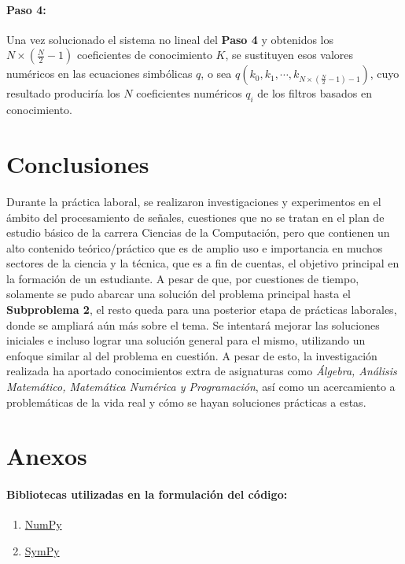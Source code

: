 \documentclass[11pt]{article}
\begin{document}
\paragraph*{Paso 4:}
Una vez solucionado el sistema no lineal del {\bf Paso 4} y obtenidos los \(N \times (\frac{N}{2} - 1)\) coeficientes de conocimiento \(K\), se sustituyen esos valores numéricos en las ecuaciones simbólicas \(q\), o sea 
\(q(k_{0}, k_{1}, \cdots, k_{N \times (\frac{N}{2} - 1) -1})\), cuyo resultado produciría los \(N\) coeficientes numéricos \(q_{i}\) de los filtros basados en conocimiento.


\clearpage

\section*{Conclusiones}
Durante la práctica laboral, se realizaron investigaciones y experimentos en el ámbito del procesamiento de señales, cuestiones que no se tratan en el plan de estudio básico de la carrera Ciencias de la Computación, 
pero que contienen un alto contenido teórico/práctico que es de amplio uso e importancia en muchos sectores de la ciencia y la técnica, que es a fin de cuentas, el objetivo principal en la formación de un estudiante. A pesar de que, 
por cuestiones de tiempo, solamente se pudo abarcar una solución del problema principal hasta el {\bf Subproblema 2}, el resto queda para una posterior etapa de prácticas laborales, donde se ampliará aún más sobre el tema. Se intentará 
mejorar las soluciones iniciales e incluso lograr una solución general para el mismo, utilizando un enfoque similar al del problema en cuestión. A pesar de esto, la investigación realizada ha aportado conocimientos extra de asignaturas como 
{\it Álgebra, Análisis Matemático, Matemática Numérica y Programación}, así como un acercamiento a problemáticas de la vida real y cómo se hayan soluciones prácticas a estas. 

\clearpage

\section*{Anexos}

\paragraph*{Bibliotecas utilizadas en la formulación del código:}
\begin{enumerate}
    \item \href{https://numpy.org/}{NumPy} 
    \item \href{https://www.sympy.org/}{SymPy} 
\end{enumerate}
\end{document}
